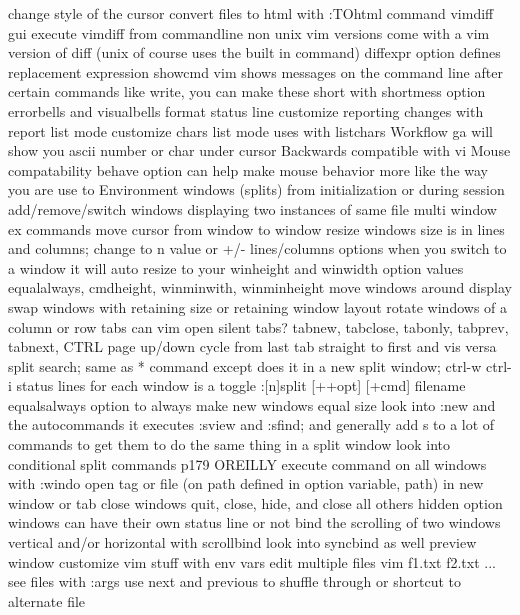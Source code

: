 \documentclass[12pt]{book}
\begin{document}
{{    change style of the cursor
  convert files to html with :TOhtml command
  vimdiff gui
    execute vimdiff from commandline
    non unix vim versions come with a vim version of diff (unix of course uses the built in command)
    diffexpr option defines replacement expression
  showcmd
  vim shows messages on the command line after certain commands like write, you can make these short with shortmess option
  errorbells and visualbells
  format status line
    customize reporting changes with report
  list mode
    customize chars list mode uses with listchars
Workflow
  ga will show you ascii number or char under cursor
  Backwards compatible with vi
  Mouse compatability
    behave option can help make mouse behavior more like the way you are use to
  Environment
    windows (splits)
      from initialization or during session
      add/remove/switch windows
      displaying two instances of same file
      multi window ex commands
      move cursor from window to window
      resize windows
        size is in lines and columns; change to n value or +/- lines/columns
        options
          when you switch to a window it will auto resize to your winheight and winwidth option values
          equalalways, cmdheight, winminwith, winminheight
      move windows around display
        swap windows with retaining size or retaining window layout
        rotate windows of a column or row
      tabs
        can vim open silent tabs?
        tabnew, tabclose, tabonly, tabprev, tabnext, CTRL page up/down
        cycle from last tab straight to first and vis versa
      split search; same as * command except does it in a new split window; ctrl-w ctrl-i
      status lines for each window is a toggle
      :[n]split [++opt] [+cmd] filename
      equalsalways option to always make new windows equal size
      look into :new and the autocommands it executes
      :sview and :sfind; and generally add s to a lot of commands to get them to do the same thing in a split window
      look into conditional split commands p179 OREILLY
      execute command on all windows with :windo
      open tag or file (on path defined in option variable, path) in new window or tab
      close windows
        quit, close, hide, and close all others
          hidden option
      windows can have their own status line or not
      bind the scrolling of two windows vertical and/or horizontal with scrollbind
        look into syncbind as well
      preview window
    customize vim stuff with env vars
    edit multiple files
      vim f1.txt f2.txt ...
      see files with :args
      use next and previous to shuffle through or shortcut to alternate file
}}
\end{document}
